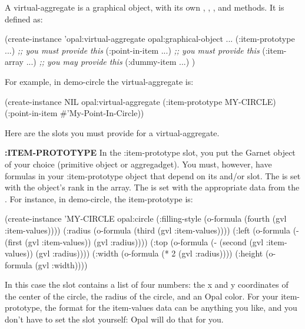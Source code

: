 A virtual-aggregate is a graphical object, with its own ,
, , and  methods.
It is defined as:
\begin{programexample}
(create-instance 'opal:virtual-aggregate opal:graphical-object
    ...
   (:item-prototype ...)  {\it ;; you must provide this}
   (:point-in-item ...)   {\it ;; you must provide this}
   (:item-array ...)      {\it ;; you may provide this}
   (:dummy-item ...)
   )
\end{programexample}

For example, in demo-circle the virtual-aggregate is:

\begin{programexample}
    (create-instance NIL opal:virtual-aggregate
       (:item-prototype MY-CIRCLE)
       (:point-in-item \#'My-Point-In-Circle))
\end{programexample}

Here are the slots you must provide for a virtual-aggregate.

{\bf :ITEM-PROTOTYPE}\newline{}
In the :item-prototype slot, you put the Garnet object of your choice
(primitive object or aggregadget).  You must, however, have formulas
in your :item-prototype object that depend on its
 and/or  slot.  The  is set with
the object's rank in the  array.  The  is
set with the appropriate data from the .  For instance, in
demo-circle, the item-prototype is:

\begin{programexample}
(create-instance 'MY-CIRCLE opal:circle
   (:filling-style (o-formula (fourth (gvl :item-values))))
   (:radius (o-formula (third (gvl :item-values))))
   (:left (o-formula (- (first (gvl :item-values)) (gvl :radius))))
   (:top (o-formula (- (second (gvl :item-values)) (gvl :radius))))
   (:width (o-formula (* 2 (gvl :radius))))
   (:height (o-formula (gvl :width))))
\end{programexample}

In this case the  slot contains a list of four numbers:
the x and y coordinates of the center of the circle, the radius of the
circle, and an Opal color.
For your item-prototype, the format for
the item-values data can be anything you like, and you don't have to
set the  slot yourself: Opal will do that for you.

